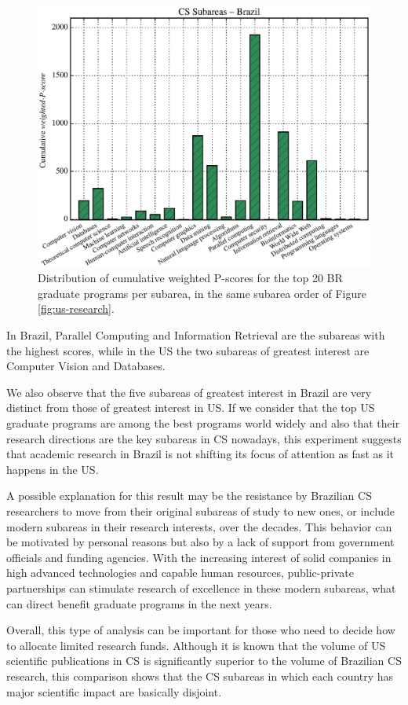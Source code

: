 \documentclass[msc]{ppgccufmg}
\begin{document}
\begin{figure}[tb]
    \centering
    \includegraphics[width=0.9\linewidth]{fig/char_br_us_research_new.eps}
    \caption{Distribution of cumulative weighted P-scores for the top 20 BR graduate programs per subarea, in the same subarea order of Figure \ref{fig:us-research}.}
    \label{fig:br-research-us-order}
\end{figure}

In Brazil, Parallel Computing and Information Retrieval are the subareas with the highest scores, while in the US the two subareas of greatest interest are Computer Vision and Databases. 
%
{\color{blue} 
We also observe that the five subareas of greatest interest in Brazil are very distinct from those of greatest interest in US. If we consider that the top US graduate programs are among the best programs world widely and also that their research directions are the key subareas in CS nowadays, this experiment suggests that academic research in Brazil is not shifting its focus of attention as fast as it happens in the US. 

A possible explanation for this result may be the resistance by Brazilian CS researchers to move from their original subareas of study to new ones, or include modern subareas in their research interests, over the decades. This behavior can be motivated by personal reasons but also by a lack of support from government officials and funding agencies. With the increasing interest of solid companies in high advanced technologies and capable human resources, public-private partnerships can stimulate research of excellence in these modern subareas, what can direct benefit graduate programs in the next years.  

Overall, this type of analysis can be important for those who need to decide how to allocate limited research funds. Although it is known that the volume of US scientific publications in CS is significantly superior to the volume of Brazilian CS research, this comparison shows that the CS subareas in which each country has major scientific impact are basically disjoint. 
}
\end{document}
